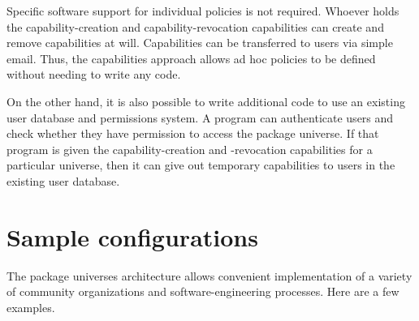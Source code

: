 \documentclass{article}
\begin{document}
Specific software support for individual policies is not required.
Whoever holds the capability-creation and capability-revocation
capabilities can create and remove capabilities at will.  Capabilities
can be transferred to users via simple email.  Thus, the capabilities
approach allows ad hoc policies to be defined without needing to write
any code.

On the other hand, it is also possible to write additional code to use
an existing user database and permissions system.  A program can
authenticate users and check whether they have permission to access
the package universe.  If that program is given the
capability-creation and -revocation capabilities for a particular
universe, then it can give out temporary capabilities to users in the
existing user database.


\section{Sample configurations}
The package universes architecture allows convenient implementation of
a variety of community organizations and software-engineering
processes.  Here are a few examples.
\end{document}
